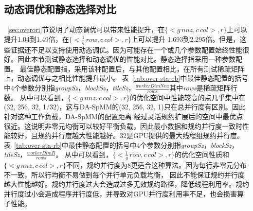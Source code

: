 \subsection{动态调优和静态选择对比}\label{sec:dystd}
~\ref{sec:overori}节说明了动态调优可以带来性能提升，在$\{<g\,nnz , c\,col>,r\}$上可以提升1.04到1.49倍，在$\{<\frac{1}{g}\,row , c\,col>,r\}$上可以提升
1.693到2.295倍。但是，这些证据还不足以支持使用动态调优。因为可能存在一个或几个参数配置始终性能很好。因此本节测试静态选择和动态调优的性能对比。静态选择指采用一种参数配置。
最佳静态配置指，采用该种配置后，与其他配置相比，在所有测试稀疏矩阵上，动态调优与之相比性能提升最小。
表~\ref{tab:over-sta-eb}中最佳静态配置的括号中4个参数分别指\textit{groupSz}，\textit{blockSz}，\textit{tileSz}，$\frac{workerDimNnz}{rows}$其中\textit{rows}是稀疏矩阵行数。
从中可以看到，$\{<g\,nnz , c\,col>,r\}$的优化空间中性能较高的点几乎集中在(32, 256, 32, 1/32)，这与DA-SpMM的(32, 256, 32, 1)只在总并行度有区别。因此针对这种工作负载，DA-SpMM的配置距离
经过灵活规约扩展后的空间中最优点很近。这说明非零元均衡可以较好平衡负载，因此最小数据和规约并行度一致时性能较好，且规约并行度越大性能越好。32是GPU提供的最大线程组规约并行度。
表~\ref{tab:over-sta-rb}中最佳静态配置的括号中4个参数分别指\textit{groupSz}，\textit{blockSz}，\textit{tileSz}，$\frac{workerDimR}{rows}$。
从中可以看到，$\{<\frac{1}{g}\,row , c\,col>,r\}$的优化空间性质和$\{<g\,nnz , c\,col>,r\}$不同，规约并行度为8更适合这种算法。因为每行非零元分布不一致，所以行均衡不易做到每个并行单元负载均衡，
因此不能保证规约并行度越大性能越好。规约并行度过大会造成过多无效规约路径，降低线程利用率。规约并行度过小会造成程序并行度低，并导致对GPU并行度利用率不足，也会损害算子性能。
